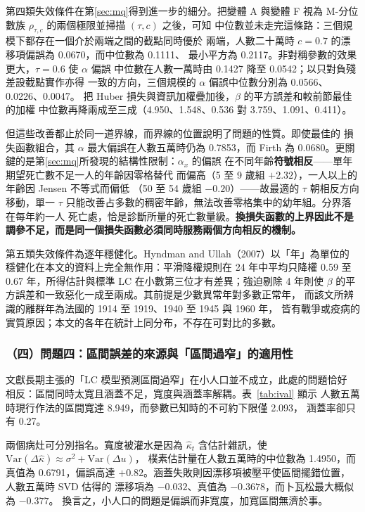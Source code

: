\documentclass[UTF8, fontset=macnew, a4paper, 12pt]{ctexart}
\newcommand{\cn}[1]{\ding{\number\numexpr171+#1\relax}}
\begin{document}
第四類失效條件在第\ref{sec:mq}得到進一步的細分。把變體 A 與變體 F 視為
M-分位數族 $\rho_{\tau,c}$ 的兩個極限並掃描 $(\tau,c)$ 之後，可知
中位數並未走完這條路：三個規模下都存在一個介於兩端之間的截點同時優於
兩端，人數二十萬時 $c=0.7$ 的漂移項偏誤為 0.0670，而中位數為 0.1111、
最小平方為 0.2117。非對稱參數的效果更大，$\tau=0.6$ 使 $\alpha$ 偏誤
中位數在人數一萬時由 0.1427 降至 0.0542；以只對負殘差設截點實作亦得
一致的方向，三個規模的 $\alpha$ 偏誤中位數分別為 0.0566、0.0226、0.0047。
把 Huber 損失與資訊加權疊加後，$\beta$ 的平方誤差和較前節最佳的加權
中位數再降兩成至三成（4.950、1.548、0.536 對 3.759、1.091、0.411）。

但這些改善都止於同一道界線，而界線的位置說明了問題的性質。即使最佳的
損失函數組合，其 $\alpha$ 最大偏誤在人數五萬時仍為 0.7853，而 Firth 為
0.0680。更關鍵的是第\ref{sec:mq}所發現的結構性限制：$\alpha_x$ 的偏誤
在不同年齡\textbf{符號相反}——單年期望死亡數不足一人的年齡因零格替代
而偏高（5 至 9 歲組 $+2.32$），一人以上的年齡因 Jensen 不等式而偏低
（50 至 54 歲組 $-0.20$）——故最適的 $\tau$ 朝相反方向移動，單一 $\tau$
只能改善占多數的稠密年齡，無法改善零格集中的幼年組。分界落在每年約一人
死亡處，恰是診斷\cn{1}所量的死亡數量級。\textbf{換損失函數的上界因此不是
調參不足，而是同一個損失函數必須同時服務兩個方向相反的機制。}

第五類失效條件為逐年穩健化。Hyndman and Ullah（2007）以「年」為單位的
穩健化在本文的資料上完全無作用：平滑降權規則在 24 年中平均只降權 0.59
至 0.67 年，所得估計與標準 LC 在小數第三位才有差異；強迫剔除 4 年則使
$\beta$ 的平方誤差和一致惡化一成至兩成。其前提是少數異常年對多數正常年，
而該文所辨識的離群年為法國的 1914 至 1919、1940 至 1945 與 1960 年，
皆有戰爭或疫病的實質原因；本文的各年在統計上同分布，不存在可對比的多數。

\subsubsection{（四）問題四：區間誤差的來源與「區間過窄」的適用性}

文獻長期主張的「LC 模型預測區間過窄」在小人口並不成立，此處的問題恰好
相反：區間同時太寬且涵蓋不足，寬度與涵蓋率解耦。表~\ref{tab:ival} 顯示
人數五萬時現行作法的區間寬達 8.949，而參數已知時的不可約下限僅 2.093，
涵蓋率卻只有 0.27。

兩個病灶可分別指名。寬度被灌水是因為 $\hat\kappa_t$ 含估計雜訊，使
$\mathrm{Var}(\Delta\hat\kappa)\approx\sigma^2+\mathrm{Var}(\Delta u)$，
樸素估計量在人數五萬時的中位數為 1.4950，而真值為 0.6791，偏誤高達
$+0.82$。涵蓋失敗則因漂移項被壓平使區間擺錯位置，人數五萬時 SVD 估得的
漂移項為 $-0.032$、真值為 $-0.3678$，而卜瓦松最大概似為 $-0.377$。
換言之，小人口的問題是偏誤而非寬度，加寬區間無濟於事。
\end{document}
